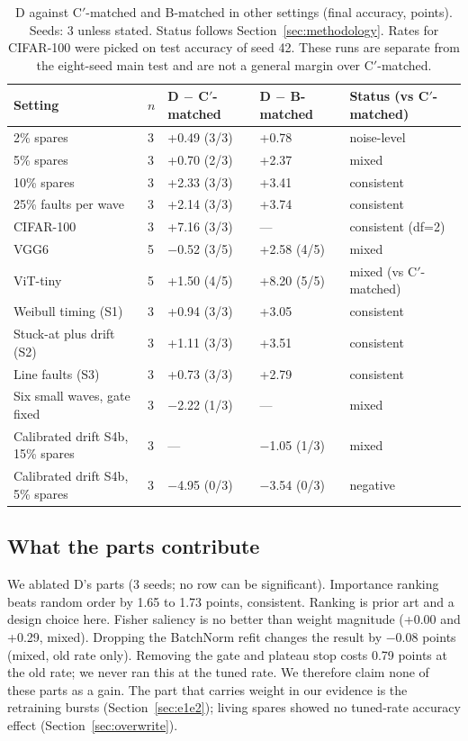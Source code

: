 \documentclass[journal]{IEEEtran}
\begin{document}
\begin{table}[t]
\centering
\caption{D against C$'$-matched and B-matched in other settings (final accuracy, points). Seeds: 3 unless stated. Status follows Section~\ref{sec:methodology}. Rates for CIFAR-100 were picked on test accuracy of seed 42. These runs are separate from the eight-seed main test and are not a general margin over C$'$-matched.}
\label{tab:other}
\small
\begin{tabular}{p{4.6cm}p{0.8cm}p{3.1cm}p{3.1cm}p{3.6cm}}
\toprule
Setting & $n$ & D $-$ C$'$-matched & D $-$ B-matched & Status (vs C$'$-matched) \\
\midrule
2\% spares & 3 & +0.49 (3/3) & +0.78 & noise-level \\
5\% spares & 3 & +0.70 (2/3) & +2.37 & mixed \\
10\% spares & 3 & +2.33 (3/3) & +3.41 & consistent \\
25\% faults per wave & 3 & +2.14 (3/3) & +3.74 & consistent \\
CIFAR-100 & 3 & +7.16 (3/3) & --- & consistent (df=2) \\
VGG6 & 5 & $-$0.52 (3/5) & +2.58 (4/5) & mixed \\
ViT-tiny & 5 & +1.50 (4/5) & +8.20 (5/5) & mixed (vs C$'$-matched) \\
Weibull timing (S1) & 3 & +0.94 (3/3) & +3.05 & consistent \\
Stuck-at plus drift (S2) & 3 & +1.11 (3/3) & +3.51 & consistent \\
Line faults (S3) & 3 & +0.73 (3/3) & +2.79 & consistent \\
Six small waves, gate fixed & 3 & $-$2.22 (1/3) & --- & mixed \\
Calibrated drift S4b, 15\% spares & 3 & --- & $-$1.05 (1/3) & mixed \\
Calibrated drift S4b, 5\% spares & 3 & $-$4.95 (0/3) & $-$3.54 (0/3) & negative \\
\bottomrule
\end{tabular}
\end{table}

\subsection{What the parts contribute}
We ablated D's parts (3 seeds; no row can be significant).
Importance ranking beats random order by 1.65 to 1.73 points, consistent.
Ranking is prior art and a design choice here.
Fisher saliency is no better than weight magnitude (+0.00 and +0.29, mixed).
Dropping the BatchNorm refit changes the result by $-0.08$ points (mixed, old rate only).
Removing the gate and plateau stop costs 0.79 points at the old rate; we never ran this at the tuned rate.
We therefore claim none of these parts as a gain.
The part that carries weight in our evidence is the retraining bursts (Section~\ref{sec:e1e2}); living spares showed no tuned-rate accuracy effect (Section~\ref{sec:overwrite}).
\end{document}
